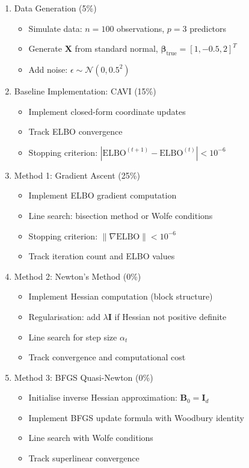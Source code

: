 \documentclass[11pt]{article}
\newcommand{\N}{\mathcal{N}}
\newcommand{\ELBO}{\text{ELBO}}
\begin{document}
\begin{enumerate}[leftmargin=*]
\item Data Generation (5\%)
\begin{itemize}
\item Simulate data: $n = 100$ observations, $p = 3$ predictors
\item Generate $\bm{X}$ from standard normal, $\bm{\beta}_{\text{true}} = [1, -0.5, 2]^T$
\item Add noise: $\epsilon \sim \N(0, 0.5^2)$
\end{itemize}

\item Baseline Implementation: CAVI (15\%)
\begin{itemize}
\item Implement closed-form coordinate updates
\item Track ELBO convergence
\item Stopping criterion: $|\ELBO^{(t+1)} - \ELBO^{(t)}| < 10^{-6}$
\end{itemize}

\item Method 1: Gradient Ascent (25\%)
\begin{itemize}
\item Implement ELBO gradient computation
\item Line search: bisection method or Wolfe conditions
\item Stopping criterion: $\|\nabla \ELBO\| < 10^{-6}$
\item Track iteration count and ELBO values
\end{itemize}

\item Method 2: Newton's Method (0\%)
\begin{itemize}
\item Implement Hessian computation (block structure)
\item Regularisation: add $\lambda \bm{I}$ if Hessian not positive definite
\item Line search for step size $\alpha_t$
\item Track convergence and computational cost
\end{itemize}

\item Method 3: BFGS Quasi-Newton (0\%)
\begin{itemize}
\item Initialise inverse Hessian approximation: $\bm{B}_0 = \bm{I}_d$
\item Implement BFGS update formula with Woodbury identity
\item Line search with Wolfe conditions
\item Track superlinear convergence
\end{itemize}


\end{enumerate}
\end{document}
